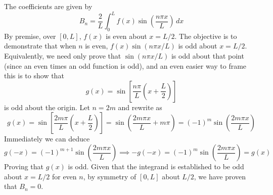 \documentclass[a4paper]{article}
\begin{document}
The coefficients are given by
\[
	B_{n} = \frac{2}{L}\int^{L}_{0} f \!\left( x \right)\sin\!\left(\frac{n \pi x}{L}\right) \, dx  
\]
By premise, over \( \!\left[ 0,L \right] \), \( f \!\left( x \right) \) is even about \( x = L/2 \). The objective is to demonstrate that when \( n \) is even, \( f \!\left( x \right)\sin\!\left(n \pi x / L\right) \) is odd about \( x = L/2 \). Equivalently, we need only prove that \( \sin\!\left(n \pi
 x / L\right) \) is odd about that point (since an even times an odd function is odd), and an even easier way to frame this is to show that
\[
	g \!\left( x \right) = \sin\!\left[\frac{n \pi}{L}\!\left( x + \frac{L}{2} \right)\right]
\]
is odd about the origin. Let \( n = 2m \) and rewrite as 
\[
	g \!\left( x \right) = \sin\!\left[\frac{2m \pi}{L}\!\left( x + \frac{L}{2}\right)\right] = \sin\!\left(\frac{2m \pi x}{L} + m \pi\right) = \!\left( -1 \right)^{m}\sin\!\left(\frac{2m \pi x}{L}\right)
\]
Immediately we can deduce
\[
	g \!\left( -x \right) = \!\left( -1 \right)^{m + 1}\sin\!\left(\frac{2m \pi x}{L}\right) \implies -g \!\left( -x \right) = \!\left( -1 \right)^{m}\sin\!\left(\frac{2m \pi x}{L}\right) = g \!\left( x \right)
\]
Proving that \( g \!\left( x \right) \) is odd. Given that the integrand is established to be odd about \( x = L/2 \) for even \( n \), by symmetry of \( \!\left[ 0,L \right] \) about \( L/2 \), we have proven that \( B_{n} = 0 \).

\vspace{12pt}

\end{document}

